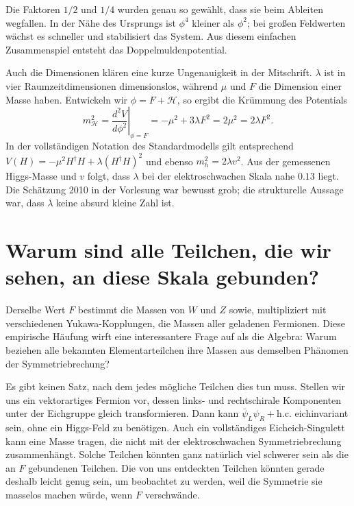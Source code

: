 Die Faktoren \(1/2\) und \(1/4\) wurden genau so gewählt, dass sie beim Ableiten wegfallen. In der Nähe des Ursprungs ist \(\phi^4\) kleiner als \(\phi^2\); bei großen Feldwerten wächst es schneller und stabilisiert das System. Aus diesem einfachen Zusammenspiel entsteht das Doppelmuldenpotential.

Auch die Dimensionen klären eine kurze Ungenauigkeit in der Mitschrift. \(\lambda\) ist in vier Raumzeitdimensionen dimensionslos, während \(\mu\) und \(F\) die Dimension einer Masse haben. Entwickeln wir \(\phi=F+\mathcal H\), so ergibt die Krümmung des Potentials
\begin{equation}
  m_{\mathcal H}^2
  =
  \left.\frac{d^2V}{d\phi^2}\right|_{\phi=F}
  =
  -\mu^2+3\lambda F^2
  =
  2\mu^2
  =
  2\lambda F^2.
  \label{eq:l10-higgs-curvature}
\end{equation}
In der vollständigen Notation des Standardmodells gilt entsprechend \(V(H)=-\mu^2H^\dagger H+\lambda(H^\dagger H)^2\) und ebenso \(m_h^2=2\lambda v^2\). Aus der gemessenen Higgs-Masse und \(v\) folgt, dass \(\lambda\) bei der elektroschwachen Skala nahe \(0.13\) liegt. Die Schätzung 2010 in der Vorlesung war bewusst grob; die strukturelle Aussage war, dass \(\lambda\) keine absurd kleine Zahl ist.

\section{Warum sind alle Teilchen, die wir sehen, an diese Skala gebunden?}

Derselbe Wert \(F\) bestimmt die Massen von \(W\) und \(Z\) sowie, multipliziert mit verschiedenen Yukawa-Kopplungen, die Massen aller geladenen Fermionen. Diese empirische Häufung wirft eine interessantere Frage auf als die Algebra: Warum beziehen alle bekannten Elementarteilchen ihre Massen aus demselben Phänomen der Symmetriebrechung?

Es gibt keinen Satz, nach dem jedes mögliche Teilchen dies tun muss. Stellen wir uns ein vektorartiges Fermion vor, dessen links- und rechtschirale Komponenten unter der Eichgruppe gleich transformieren. Dann kann \(\bar\psi_L\psi_R+\mathrm{h.c.}\) eichinvariant sein, ohne ein Higgs-Feld zu benötigen. Auch ein vollständiges Eicheich-Singulett kann eine Masse tragen, die nicht mit der elektroschwachen Symmetriebrechung zusammenhängt. Solche Teilchen könnten ganz natürlich viel schwerer sein als die an \(F\) gebundenen Teilchen. Die von uns entdeckten Teilchen könnten gerade deshalb leicht genug sein, um beobachtet zu werden, weil die Symmetrie sie masselos machen würde, wenn \(F\) verschwände.


